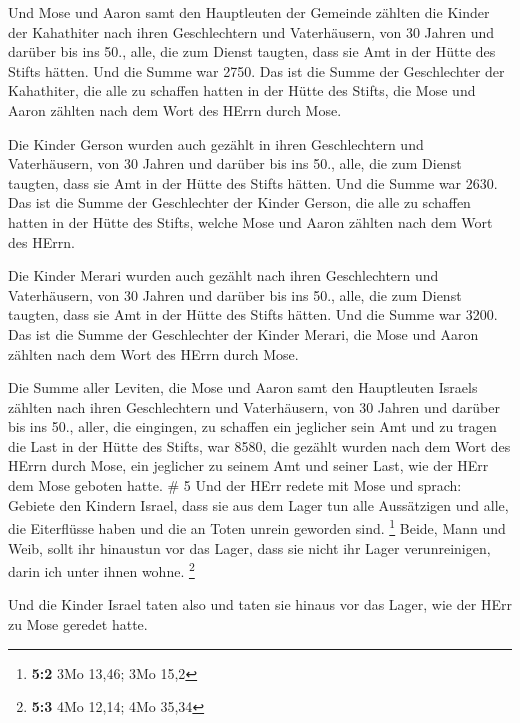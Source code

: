  Und Mose und Aaron samt den Hauptleuten der Gemeinde
zählten die Kinder der Kahathiter nach ihren Geschlechtern und
Vaterhäusern,  von 30 Jahren und darüber bis ins 50., alle,
die zum Dienst taugten, dass sie Amt in der Hütte des Stifts hätten.
 Und die Summe war 2750.  Das ist die Summe
der Geschlechter der Kahathiter, die alle zu schaffen hatten in der
Hütte des Stifts, die Mose und Aaron zählten nach dem Wort des HErrn
durch Mose.

 Die Kinder Gerson wurden auch gezählt in ihren
Geschlechtern und Vaterhäusern,  von 30 Jahren und darüber
bis ins 50., alle, die zum Dienst taugten, dass sie Amt in der Hütte des
Stifts hätten.  Und die Summe war 2630.  Das
ist die Summe der Geschlechter der Kinder Gerson, die alle zu schaffen
hatten in der Hütte des Stifts, welche Mose und Aaron zählten nach dem
Wort des HErrn.

 Die Kinder Merari wurden auch gezählt nach ihren
Geschlechtern und Vaterhäusern,  von 30 Jahren und darüber
bis ins 50., alle, die zum Dienst taugten, dass sie Amt in der Hütte des
Stifts hätten.  Und die Summe war 3200.  Das
ist die Summe der Geschlechter der Kinder Merari, die Mose und Aaron
zählten nach dem Wort des HErrn durch Mose.

 Die Summe aller Leviten, die Mose und Aaron samt den
Hauptleuten Israels zählten nach ihren Geschlechtern und Vaterhäusern,
 von 30 Jahren und darüber bis ins 50., aller, die
eingingen, zu schaffen ein jeglicher sein Amt und zu tragen die Last in
der Hütte des Stifts,  war 8580,  die gezählt
wurden nach dem Wort des HErrn durch Mose, ein jeglicher zu seinem Amt
und seiner Last, wie der HErr dem Mose geboten hatte. \# 5 
Und der HErr redete mit Mose und sprach:  Gebiete den
Kindern Israel, dass sie aus dem Lager tun alle Aussätzigen und alle,
die Eiterflüsse haben und die an Toten unrein geworden sind. \footnote{\textbf{5:2}
  3Mo 13,46; 3Mo 15,2}  Beide, Mann und Weib, sollt ihr
hinaustun vor das Lager, dass sie nicht ihr Lager verunreinigen, darin
ich unter ihnen wohne. \footnote{\textbf{5:3} 4Mo 12,14; 4Mo 35,34}

 Und die Kinder Israel taten also und taten sie hinaus vor
das Lager, wie der HErr zu Mose geredet hatte.

